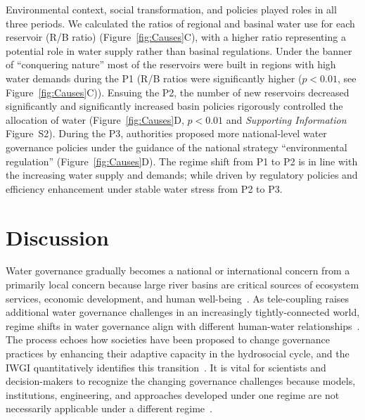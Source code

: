 \documentclass[draft]{agujournal2019}
\begin{document}
Environmental context, social transformation, and policies played roles in all three periods.
We calculated the ratios of regional and basinal water use for each reservoir (R/B ratio) (Figure~\ref{fig:Causes}C), with a higher ratio representing a potential role in water supply rather than basinal regulations.
Under the banner of ``conquering nature'' most of the reservoirs were built in regions with high water demands during the P1 (R/B ratios were significantly higher ($p<0.01$, see Figure~\ref{fig:Causes}C)).
Ensuing the P2, the number of new reservoirs decreased significantly and significantly increased basin policies rigorously controlled the allocation of water (Figure~\ref{fig:Causes}D, $p<0.01$ and \textit{Supporting Information} Figure~S2).
During the P3, authorities proposed more national-level water governance policies under the guidance of the national strategy ``environmental regulation'' (Figure~\ref{fig:Causes}D).
The regime shift from P1 to P2 is in line with the increasing water supply and demands; while driven by regulatory policies and efficiency enhancement under stable water stress from P2 to P3.


\section{Discussion}\label{sec12}

Water governance gradually becomes a national or international concern from a primarily local concern because large river basins are critical sources of ecosystem services, economic development, and human well-being~\cite{best2019,best2020}.
As tele-coupling raises additional water governance challenges in an increasingly tightly-connected world, regime shifts in water governance align with different human-water relationships~\cite{diaz2019}.
The process echoes how societies have been proposed to change governance practices by enhancing their adaptive capacity in the hydrosocial cycle, and the IWGI quantitatively identifies this transition~\cite{loch2020,turton1999}.
It is vital for scientists and decision-makers to recognize the changing governance challenges because models, institutions, engineering, and approaches developed under one regime are not necessarily applicable under a different regime~\cite{reyers2018}.
\end{document}
